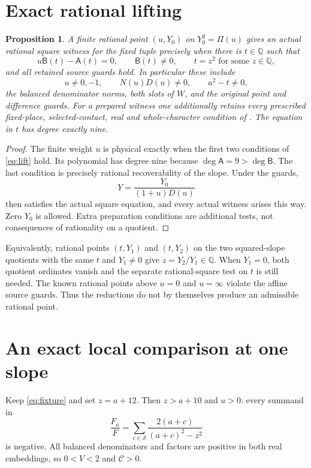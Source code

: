 \documentclass[11pt,a4paper]{article}
\newtheorem{proposition}[theorem]{Proposition}
\newcommand{\Q}{\mathbb Q}
\begin{document}
\section{Exact rational lifting}

\begin{proposition}\label{prop:lift}
A finite rational point $(u,Y_0)$ on $Y_0^2=\Pi(u)$ gives an
actual rational square witness for the fixed tuple precisely when
there is $t\in\Q$ such that
\begin{equation}\label{eq:lift}
 u\mathsf B(t)-\mathsf A(t)=0,\qquad
 \mathsf B(t)\ne0,\qquad t=z^2\text{ for some }z\in\Q,
\end{equation}
and all retained source guards hold. In particular these include
\[
 u\ne0,-1,\qquad N(u)D(u)\ne0,\qquad a^2-t\ne0,
\]
the balanced denominator norms, both slots of $W$, and the original
point and difference guards. For a prepared witness one additionally
retains every prescribed fixed-place, selected-contact, real and
whole-character condition of \cite{Criterion}.
The equation in $t$ has degree exactly nine.
\end{proposition}
\begin{proof}
The finite weight $u$ is physical exactly when the first two
conditions of \eqref{eq:lift} hold. Its polynomial has degree nine
because $\deg\mathsf A=9>\deg\mathsf B$. The last condition
is precisely rational recoverability of the slope. Under the guards,
\[
                   Y=\frac{Y_0}{(1+u)D(u)}
\]
then satisfies the actual square equation, and every actual witness
arises this way. Zero $Y_0$ is allowed. Extra preparation conditions
are additional tests, not consequences of rationality on a quotient.
\end{proof}

Equivalently, rational points $(t,Y_1)$ and $(t,Y_2)$ on the two
squared-slope quotients with the same $t$ and $Y_1\ne0$ give
$z=Y_2/Y_1\in\Q$. When $Y_1=0$, both quotient ordinates
vanish and the separate rational-square test on $t$ is still needed.
The known rational points above $u=0$ and $u=\infty$ violate the
affine source guards. Thus the reductions do not by themselves
produce an admissible rational point.

\section{An exact local comparison at one slope}

Keep \eqref{eq:fixture} and set $z=a+12$. Then $z>a+10$ and
$u>0$: every summand in
\[
                     \frac{F_a}{F}
               =\sum_{c\in\mathcal S}\frac{2(a+c)}{(a+c)^2-z^2}
\]
is negative. All balanced denominators and factors are positive in
both real embeddings, so $0<V<2$ and $\mathcal C>0$.
\end{document}
